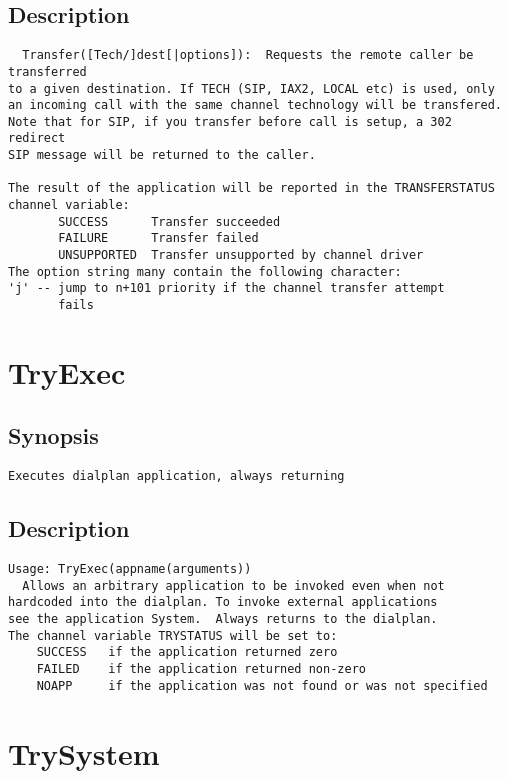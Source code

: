 \subsection{Description}
\begin{verbatim}
  Transfer([Tech/]dest[|options]):  Requests the remote caller be transferred
to a given destination. If TECH (SIP, IAX2, LOCAL etc) is used, only
an incoming call with the same channel technology will be transfered.
Note that for SIP, if you transfer before call is setup, a 302 redirect
SIP message will be returned to the caller.

The result of the application will be reported in the TRANSFERSTATUS
channel variable:
       SUCCESS      Transfer succeeded
       FAILURE      Transfer failed
       UNSUPPORTED  Transfer unsupported by channel driver
The option string many contain the following character:
'j' -- jump to n+101 priority if the channel transfer attempt
       fails

\end{verbatim}


\section{TryExec}
\subsection{Synopsis}
\begin{verbatim}
Executes dialplan application, always returning
\end{verbatim}
\subsection{Description}
\begin{verbatim}
Usage: TryExec(appname(arguments))
  Allows an arbitrary application to be invoked even when not
hardcoded into the dialplan. To invoke external applications
see the application System.  Always returns to the dialplan.
The channel variable TRYSTATUS will be set to:
    SUCCESS   if the application returned zero
    FAILED    if the application returned non-zero
    NOAPP     if the application was not found or was not specified

\end{verbatim}


\section{TrySystem}
